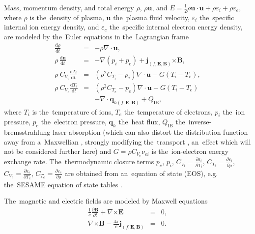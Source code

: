 \documentclass[
 aps,
 jmp,
 amsmath,amssymb,
 twocolumn,
]{revtex4-1}
\newcommand{\pdv}[2]{\frac{\partial{#1}}{\partial{#2}}}
\newcommand{\vect}[1]{\boldsymbol{#1}}
\newcommand{\dI}{\text{d}}
\newcommand{\nuei}{\nu_{ei}}
\newcommand{\E}{\vect{E}}
\newcommand{\B}{\vect{B}}
\newcommand{\Te}{T_e}
\newcommand{\Ti}{T_i}
\begin{document}
Mass, momentum density, and total energy 
$\rho$, $\rho\vect{u}$, and 
$E = \frac{1}{2}\rho\vect{u}\cdot\vect{u} + 
 \rho \varepsilon_i + \rho \varepsilon_e$, 
where $\rho$ is 
the~density of plasma, $\vect{u}$ the~plasma fluid velocity, $\varepsilon_i$ 
the~specific internal ion energy density, 
and $\varepsilon_e$ the~specific internal 
electron energy density,
are modeled by the~Euler equations in the~Lagrangian frame 
\cite{Holec_DGBGKT_2016, Holec_PoPNTH2018}
\begin{eqnarray}
 \frac{\dI \rho}{\dI t} &=& - \rho\nabla\cdot\vect{u}
 , 
 \label{eq:NTH_rho}\\
 \rho\, \frac{\dI \vect{u}}{\dI t} &=& - \nabla (p_i + p_e) 
 + \vect{j}_{(f, \E, \B)} \vect{\times}\B
 ,  
 \label{eq:NTH_v}\\
 \rho~C_{V_i}\frac{\dI \Ti}{\dI t} 
 &=& 
 \left(\rho^2 C_{\Ti} - p_i\right)\nabla\cdot\vect{u} 
 - G(\Ti - \Te)
 ,  
 \label{eq:NTH_Ti}\\
 \rho~C_{V_e} \frac{\dI \Te}{\dI t} 
  &=& 
 \left(\rho^2 C_{\Te} - p_e \right) \nabla\cdot\vect{u}  
 + G(T_i - \Te)
 \nonumber\\ 
 && - \nabla\cdot\vect{q}_{h(f, \E, \B)} + Q_{\text{IB}} 
 , 
 \label{eq:NTH_Te}
\end{eqnarray}
where $\Ti$ is the~temperature of ions, $\Te$ the~temperature of electrons,
$p_i$ the~ion pressure, $p_e$ the~electron pressure,
$\vect{q}_h$ the~heat flux, $Q_{\text{IB}}$ the~inverse-bremsstrahlung laser 
absorption (which can also distort the distribution function away from 
a~Maxwellian \cite{Langdon80}, strongly modifying the~transport 
\cite{Ridgers08_2}, an~effect which will not be considered further here) and 
$G = \rho C_{V_e} \nuei$ is 
the~ion-electron energy exchange rate. 
The~thermodynamic closure terms 
$p_e$, $p_i$, 
$C_{V_i} = \frac{\partial \varepsilon_i}{\partial \Ti}$, 
$C_{\Ti} = \pdv{\varepsilon_i}{\rho}$,
$C_{V_e} = \frac{\partial \varepsilon_e}{\partial \Te}$, 
$C_{\Te} = \pdv{\varepsilon_e}{\rho}$
are obtained from an~equation of state (EOS), e.g.
the~SESAME equation of state tables
\cite{T4_SESAME_83, Lyon_SESAME_EOS_database-TechRep-92}.

The~magnetic and electric fields are modeled by Maxwell equations
\begin{eqnarray}
  \frac{1}{c}\frac{\partial \B}{\partial t} + \nabla\vect{\times}\E &=& 0 
  ,
  \label{eq:Faraday} \\
  \nabla\vect{\times}\B - \frac{4\pi}{c} \vect{j}_{(f, \E, \B)} &=& 0
  .
  \label{eq:Ampere}
\end{eqnarray}
\end{document}
